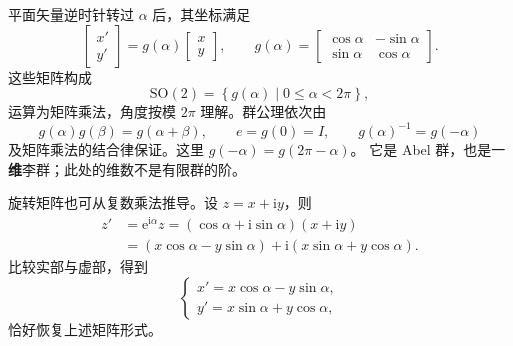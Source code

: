 \begin{example}
平面矢量逆时针转过 $\alpha$ 后，其坐标满足
\begin{equation}
\begin{bmatrix}x'\\y'\end{bmatrix}
=g\left(\alpha\right)\begin{bmatrix}x\\y\end{bmatrix},\qquad
g\left(\alpha\right)=\begin{bmatrix}\cos\alpha&-\sin\alpha\\\sin\alpha&\cos\alpha\end{bmatrix}.
\end{equation}
这些矩阵构成
\begin{equation}
\mathrm{SO}\left(2\right)=\left\{g\left(\alpha\right)\mid 0\leqslant\alpha<2\pi\right\},
\end{equation}
运算为矩阵乘法，角度按模 $2\pi$ 理解。群公理依次由
\begin{equation}
g\left(\alpha\right)g\left(\beta\right)=g\left(\alpha+\beta\right),\qquad
e=g\left(0\right)=I,\qquad g\left(\alpha\right)^{-1}=g\left(-\alpha\right)
\end{equation}
及矩阵乘法的结合律保证。这里 $g\left(-\alpha\right)=g\left(2\pi-\alpha\right)$。
它是 Abel 群，也是一\textbf{维}李群；此处的维数不是有限群的阶。

旋转矩阵也可从复数乘法推导。设 $z=x+\mathrm{i}y$，则
\begin{align}
z'&=\mathrm{e}^{\mathrm{i}\alpha}z
=\left(\cos\alpha+\mathrm{i}\sin\alpha\right)\left(x+\mathrm{i}y\right)\\
&=\left(x\cos\alpha-y\sin\alpha\right)
+\mathrm{i}\left(x\sin\alpha+y\cos\alpha\right).
\end{align}
比较实部与虚部，得到
\begin{equation}
\begin{cases}
x'=x\cos\alpha-y\sin\alpha,\\
y'=x\sin\alpha+y\cos\alpha,
\end{cases}
\end{equation}
恰好恢复上述矩阵形式。
\end{example}

